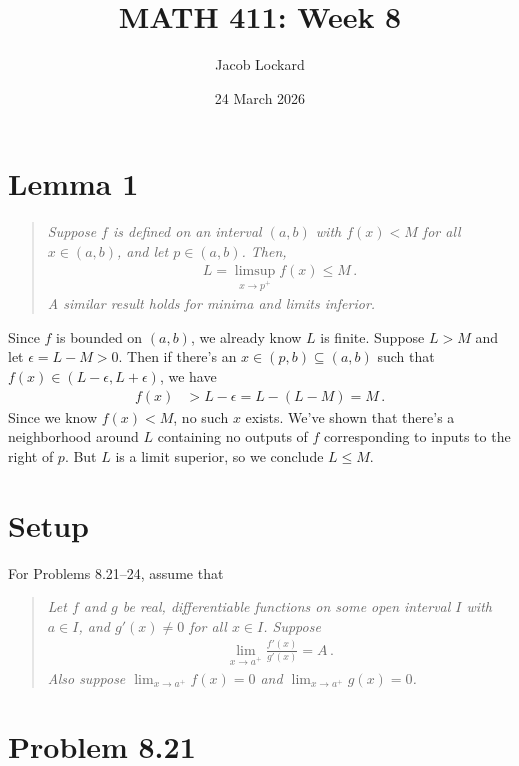 \documentclass{article}
\begin{document}
\title{MATH 411: Week 8}
\author{Jacob Lockard}
\date{24 March 2026}

\maketitle

\section*{Lemma 1}

\begin{quote}
    \itshape
    Suppose $f$ is defined on an interval $(a, b)$ with $f(x) < M$
    for all $x \in (a,b)$, and let $p \in (a,b)$. Then,
    \begin{align*}
        L = \limsup_{x \to p^+} f(x) \leq M \,.
    \end{align*}
    A similar result holds for minima and limits inferior.
\end{quote}
Since $f$ is bounded on $(a, b)$, we already know $L$
is finite. Suppose $L > M$ and let $\epsilon = L-M > 0$.
Then if there's an $x \in (p,b) \subseteq (a,b)$ such that
$f(x) \in (L - \epsilon, L + \epsilon)$, we have
\begin{align*}
    f(x) &> L - \epsilon = L - (L-M) = M \,.
\end{align*}
Since we know $f(x) < M$, no such $x$ exists.
We've shown that there's a neighborhood around $L$ 
containing no outputs of $f$ corresponding to inputs
to the right of $p$. But $L$ is a limit superior,
so we conclude $L \leq M$.\qedsymbol

\section*{Setup}

For Problems 8.21--24, assume that
\begin{quote}
    \itshape
    Let $f$ and $g$ be real, differentiable functions on some open interval $I$
    with $a \in I$, and $g'(x) \neq 0$ for all $x \in I$.
    Suppose
    \begin{align*}
        \lim_{x \to a^+} \frac{f'(x)}{g'(x)} = A \,.
    \end{align*}
    Also suppose $\lim_{x \to a^+} f(x) = 0$ and $\lim_{x \to a^+} g(x) = 0$.
\end{quote}

\section*{Problem 8.21}
\end{document}
